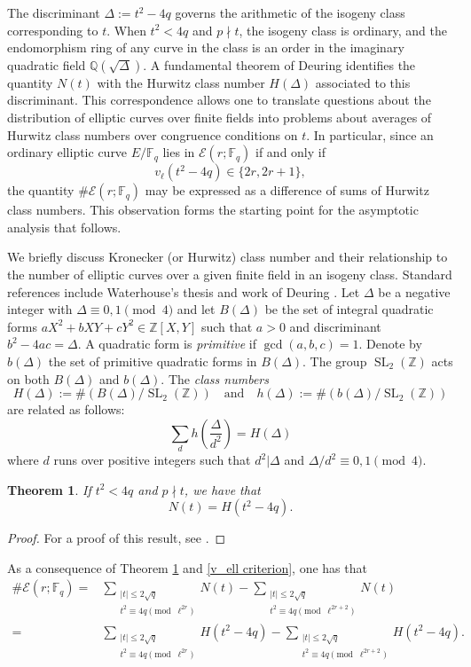 \documentclass[table]{amsart}
\newtheorem{theorem}{Theorem}[section]
\newcommand{\Z}{\mathbb{Z}}
\newcommand{\Q}{\mathbb{Q}}
\newcommand{\F}{\mathbb{F}}
\newcommand{\op}[1]{\operatorname{#1}}
\numberwithin{equation}{section}
\begin{document}
\par
The discriminant $\Delta:=t^2-4q$
governs the arithmetic of the isogeny class corresponding to $t$. When $t^2<4q$ and $p\nmid t$, the isogeny class is ordinary, and the endomorphism ring of any curve in the class is an order in the imaginary quadratic field $\Q(\sqrt{\Delta})$. A fundamental theorem of Deuring identifies the quantity $N(t)$ with the Hurwitz class number $H(\Delta)$ associated to this discriminant. This correspondence allows one to translate questions about the distribution of elliptic curves over finite fields into problems about averages of Hurwitz class numbers over congruence conditions on $t$. In particular, since an ordinary elliptic curve $E/\F_q$ lies in $\mathcal{E}(r;\F_q)$ if and only if
\begin{equation}\label{v_ell criterion}
v_\ell(t^2-4q)\in\{2r,2r+1\},
\end{equation}
the quantity $\#\mathcal{E}(r;\F_q)$ may be expressed as a difference of sums of Hurwitz class numbers. This observation forms the starting point for the asymptotic analysis that follows.


\par We briefly discuss Kronecker (or Hurwitz) class number and their relationship to the number of elliptic curves over a given finite field in an isogeny class. Standard references include Waterhouse's thesis \cite{waterhouse} and work of Deuring \cite{deuring1, deuring2}. Let $\Delta$ be a negative integer with $\Delta\equiv 0,1\pmod{4}$ and let $B(\Delta)$ be the set of integral quadratic forms $aX^2+bXY+cY^2\in \Z[X,Y]$ such that $a>0$ and discriminant $b^2-4ac=\Delta$. A quadratic form is \emph{primitive} if $\op{gcd}(a,b,c)=1$. Denote by $b(\Delta)$ the set of primitive quadratic forms in $B(\Delta)$. The group $\op{SL}_2(\Z)$ acts on both $B(\Delta)$ and $b(\Delta)$. The \emph{class numbers}
\[H(\Delta):=\# \left(B(\Delta)/\op{SL}_2(\Z)\right)\quad \text{and}\quad h(\Delta):=\# \left(b(\Delta)/\op{SL}_2(\Z)\right)\]are related as follows:
\[\sum_d h\left(\frac{\Delta}{d^2}\right)=H(\Delta)\]
\noindent where $d$ runs over positive integers such that $d^2|\Delta$ and $\Delta/d^2\equiv 0,1\pmod{4}$.
\begin{theorem}\label{N(t)= thm}
    If $t^2<4q$ and $p\nmid t$, we have that 
    \[N(t)=H(t^2-4q).\]
\end{theorem}
\begin{proof}
    For a proof of this result, see \cite[Theorem 4.6]{Schoof}.
\end{proof}
As a consequence of Theorem \ref{N(t)= thm} and \eqref{v_ell criterion}, one has that 
\[\begin{split}\# \mathcal{E}(r;\F_q)=&\sum_{\substack{|t|\leq 2\sqrt{q}\\
t^2\equiv 4q\pmod{\ell^{2r}}}} N(t)-\sum_{\substack{|t|\leq 2\sqrt{q}\\
t^2\equiv 4q\pmod{\ell^{2r+2}}}} N(t)\\
=& \sum_{\substack{|t|\leq 2\sqrt{q}\\
t^2\equiv 4q\pmod{\ell^{2r}}}} H(t^2-4q)-\sum_{\substack{|t|\leq 2\sqrt{q}\\
t^2\equiv 4q\pmod{\ell^{2r+2}}}} H(t^2-4q).
\end{split}\]
\end{document}
